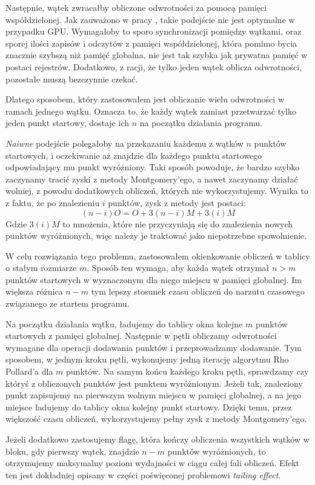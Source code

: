 Następnie, wątek zwracałby obliczone odwrotności za pomocą pamięci współdzielonej.
Jak zauważono w pracy \cite{Boss2015}, takie podejście nie jest optymalne w przypadku GPU.
Wymagałoby to sporo synchronizacji pomiędzy wątkami, oraz sporej ilości zapisów i odczytów
z pamięci współdzielonej, która pomimo bycia znacznie szybszą niż pamięć globalna, nie jest tak
szybka jak prywatna pamięć w postaci rejestrów. Dodatkowo, z racji, że tylko jeden
wątek oblicza odwrotności, pozostałe muszą bezczynnie czekać.
\par
Dlatego sposobem, który zastosowałem jest obliczanie wielu odwrotności
w ramach jednego wątku. Oznacza to, że każdy wątek zamiast przetwarzać tylko jeden punkt startowy,
dostaje ich $n$ na początku działania programu.
\par
\textit{Naiwne} podejście polegałoby na przekazaniu każdemu z wątków $n$ punktów startowych,
i oczekiwanie aż znajdzie dla każdego punktu startowego odpowiadający mu punkt wyróżniony. Taki sposób powoduje,
że bardzo szybko zaczynamy tracić zyski z metody Montgomery'ego, a nawet zaczynamy działać wolniej,
z powodu dodatkowych obliczeń, których nie wykorzystujemy.
Wynika to z faktu,
że po znalezieniu $i$ punktów, zysk z metody jest postaci:
$$
    (n-i)O = O + 3(n-i)M + 3(i)M
$$
Gdzie $3(i)M$ to mnożenia, które nie przyczyniają się do znalezienia nowych punktów wyróżnionych, więc należy je traktować jako niepotrzebne spowolnienie.
\par
W celu rozwiązania tego problemu, zastosowałem okienkowanie obliczeń w tablicy o stałym rozmiarze $m$.
Sposób ten wymaga, aby każda wątek otrzymał $n > m$ punktów startowych w wyznaczonym dla niego miejscu w pamięci globalnej.
Im większa różnica $n-m$ tym lepszy
stosunek czasu obliczeń do narzutu czasowego związanego ze startem programu.
\par
Na początku działania wątku, ładujemy do tablicy okna kolejne $m$ punktów startowych z pamięci globalnej.
Następnie w pętli obliczamy odwrotności wymagane dla operacji dodawania punktów i przeprowadzamy dodawanie. Tym sposobem,
w jednym kroku pętli, wykonujemy jedną iterację algorytmu Rho Pollard'a dla $m$ punktów. Na samym końcu każdego kroku pętli,
sprawdzamy czy któryś z obliczonych punktów jest punktem wyróżnionym. Jeżeli tak,
znaleziony punkt zapisujemy na pierwszym wolnym miejscu w pamięci globalnej, a na jego miejsce ładujemy do tablicy
okna kolejny punkt startowy.
Dzięki temu, przez większość czasu obliczeń, wykorzystujemy pełny zysk z metody Montgomery'ego.
\par
Jeżeli dodatkowo zastosujemy flagę, która kończy obliczenia wszystkich wątków w bloku, gdy pierwszy wątek,
znajdzie $n-m$ punktów wyróżnionych, to otrzymujemy maksymalny poziom wydajności w ciągu całej fali obliczeń.
Efekt ten jest dokładniej opisany w części poświęconej problemowi \textit{tailing effect}.

